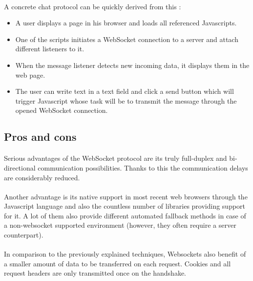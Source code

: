 \paragraph{} A concrete chat protocol can be quickly derived from this :

\begin{itemize}
 \item A user displays a page in his browser and loads all referenced 
Javascripts.
 \item One of the scripts initiates a WebSocket connection to a server and 
attach different listeners to it.
 \item When the message listener detects new incoming data, it displays them in 
the web page.
 \item The user can write text in a text field and click a send button which 
will trigger Javascript whose task will be to transmit the message through the 
opened WebSocket connection.
\end{itemize}

\subsection{Pros and cons}

\paragraph{} Serious advantages of the WebSocket protocol are its truly 
full-duplex and bi-directional communication possibilities. Thanks to this the 
communication delays are considerably reduced.

\paragraph{} Another advantage is its native support in most recent web 
browsers through the Javascript language and also the countless number of 
libraries providing support for it. A lot of them also provide different 
automated fallback methods in case of a non-websocket supported environment 
(however, they often require a server counterpart).

\paragraph{} In comparison to the previously explained techniques, Websockets 
also 
benefit of a smaller amount of data to be transferred on each request. Cookies 
and all request headers are only transmitted once on the handshake.

